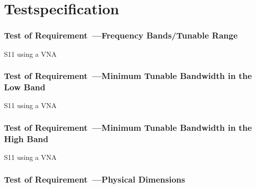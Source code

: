 \section{Testspecification}
\subsubsection{Test of Requirement~---Frequency Bands/Tunable Range}
S11 using a VNA 
\subsubsection{Test of Requirement~---Minimum Tunable Bandwidth in the Low Band}
S11 using a VNA

\subsubsection{Test of Requirement~---Minimum Tunable Bandwidth in the High Band}
S11 using a VNA

\subsubsection{Test of Requirement~---Physical Dimensions}